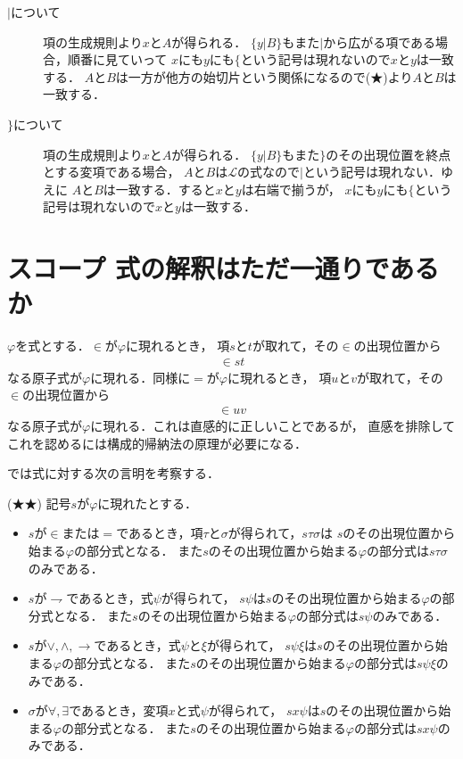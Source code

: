 \documentclass[a4j,10.5pt,oneside,openany]{jsbook}
\theoremstyle{mystyle}
\begin{document}
\begin{description}
		\item[$|$について]
			項の生成規則より$x$と$A$が得られる．
			$\{y|B\}$もまた$|$から広がる項である場合，順番に見ていって
			$x$にも$y$にも$\{$という記号は現れないので$x$と$y$は一致する．
			$A$と$B$は一方が他方の始切片という関係になるので(★)より$A$と$B$は一致する．
			
		\item[$\}$について]
			項の生成規則より$x$と$A$が得られる．
			$\{y|B\}$もまた$\}$のその出現位置を終点とする変項である場合，
			$A$と$B$は$\mathcal{L}$の式なので$|$という記号は現れない．ゆえに
			$A$と$B$は一致する．すると$x$と$y$は右端で揃うが，
			$x$にも$y$にも$\{$という記号は現れないので$x$と$y$は一致する．
	\end{description}
	
\section{スコープ 式の解釈はただ一通りであるか}
	$\varphi$を式とする．$\in$が$\varphi$に現れるとき，
	項$s$と$t$が取れて，その$\in$の出現位置から
	\begin{align}
		\in st
	\end{align}
	なる原子式が$\varphi$に現れる．同様に$=$が$\varphi$に現れるとき，
	項$u$と$v$が取れて，その$\in$の出現位置から
	\begin{align}
		\in uv
	\end{align}
	なる原子式が$\varphi$に現れる．これは直感的に正しいことであるが，
	直感を排除してこれを認めるには構成的帰納法の原理が必要になる．
	
	では式に対する次の言明を考察する．
	
	\begin{screen}
		(★★) 記号$s$が$\varphi$に現れたとする．
		\begin{itemize}
			\item $s$が$\in$または$=$であるとき，項$\tau$と$\sigma$が得られて，$s \tau \sigma$は
				$s$のその出現位置から始まる$\varphi$の部分式となる．
				また$s$のその出現位置から始まる$\varphi$の部分式は$s \tau \sigma$のみである．
				
			\item $s$が$\rightharpoondown$であるとき，式$\psi$が得られて，
				$s \psi$は$s$のその出現位置から始まる$\varphi$の部分式となる．
				また$s$のその出現位置から始まる$\varphi$の部分式は$s \psi$のみである．
				
			\item $s$が$\vee,\wedge,\rightarrow$であるとき，式$\psi$と$\xi$が得られて，
				$s \psi \xi$は$s$のその出現位置から始まる$\varphi$の部分式となる．
				また$s$のその出現位置から始まる$\varphi$の部分式は$s \psi \xi$のみである．
				
			\item $\sigma$が$\forall, \exists$であるとき，変項$x$と式$\psi$が得られて，
				$s x \psi$は$s$のその出現位置から始まる$\varphi$の部分式となる．
				また$s$のその出現位置から始まる$\varphi$の部分式は$s x \psi$のみである．
		\end{itemize}
	\end{screen}
	
\end{document}
